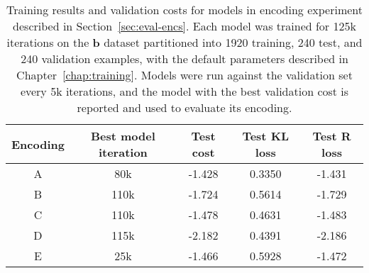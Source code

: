 \begin{table}[h]
\centering
    \caption[Training results for models in encoding experiment]{Training results  and validation costs for models in encoding experiment described in Section~\ref{sec:eval-encs}.
    Each model was trained for 125k iterations on the \textbf{b} dataset partitioned into 1920 training, 240 test, and 240 validation examples, with the default parameters described in Chapter~\ref{chap:training}.
    Models were run against the validation set every 5k iterations, and the model with the best validation cost is reported and used to evaluate its encoding.
    \label{apptbl:train-encs}}
\begin{tabular}{c c c c c}
\toprule
    Encoding & Best model iteration & Test cost & Test KL loss & Test R loss \\ \midrule
    A & 80k & -1.428 & 0.3350 & -1.431 \\
    B & 110k & -1.724 & 0.5614 & -1.729 \\
    C & 110k & -1.478 & 0.4631 & -1.483 \\
    D & 115k & -2.182 & 0.4391 & -2.186 \\
    E & 25k & -1.466 & 0.5928 &  -1.472
\end{tabular}
\end{table}

